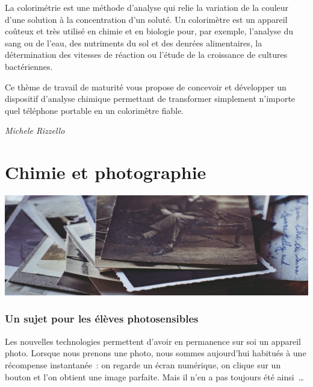 \documentclass[
  10pt,
  french,
  a5paper,
  openany]{book}
\newenvironment{signature}{\begin{flushright}}{\end{flushright}}
\begin{document}
La colorimétrie est une méthode d'analyse qui relie la variation de la couleur d'une solution à la concentration d'un soluté. Un colorimètre est un appareil coûteux et très utilisé en chimie et en biologie pour, par exemple, l'analyse du sang ou de l'eau, des nutriments du sol et des denrées alimentaires, la détermination des vitesses de réaction ou l'étude de la croissance de cultures bactériennes.

Ce thème de travail de maturité vous propose de concevoir et développer un dispositif d'analyse chimique permettant de transformer simplement n'importe quel téléphone portable en un colorimètre fiable.

\begin{signature}
\emph{Michele Rizzello}

\end{signature}

\hypertarget{chimie-et-photographie}{%
\chapter{Chimie et photographie}\label{chimie-et-photographie}}

\begin{center}
\includegraphics[width=1\textwidth,height=\textheight]{images/chimie-et-photographie.jpg}

\end{center}


\hypertarget{un-sujet-pour-les-uxe9luxe8ves-photosensibles}{%
\subsection*{Un sujet pour les élèves photosensibles}\label{un-sujet-pour-les-uxe9luxe8ves-photosensibles}}

Les nouvelles technologies permettent d'avoir en permanence sur soi un appareil photo. Lorsque nous prenons une photo, nous sommes aujourd'hui habitués à une récompense instantanée~: on regarde un écran numérique, on clique sur un bouton et l'on obtient une image parfaite. Mais il n'en a pas toujours été ainsi~\ldots{}
\end{document}
